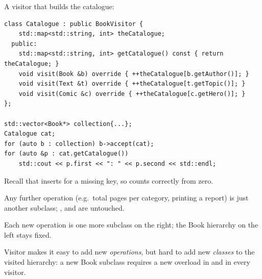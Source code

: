 A visitor that builds the catalogue:
\begin{lstlisting}[style=cpp]
class Catalogue : public BookVisitor {
    std::map<std::string, int> theCatalogue;
  public:
    std::map<std::string, int> getCatalogue() const { return theCatalogue; }
    void visit(Book &b) override { ++theCatalogue[b.getAuthor()]; }
    void visit(Text &t) override { ++theCatalogue[t.getTopic()]; }
    void visit(Comic &c) override { ++theCatalogue[c.getHero()]; }
};

std::vector<Book*> collection{...};
Catalogue cat;
for (auto b : collection) b->accept(cat);
for (auto &p : cat.getCatalogue())
    std::cout << p.first << ": " << p.second << std::endl;
\end{lstlisting}
Recall that  inserts  for a missing key, so
 counts correctly from zero.

Any further operation (e.g.\ total pages per category, printing a report) is
just another  subclass; ,  and
 are untouched.

\begin{center}

\small Each new operation is one more subclass on the right; the Book hierarchy on the left stays fixed.
\end{center}

\begin{important}
Visitor makes it easy to add new \emph{operations}, but hard to add new
\emph{classes} to the visited hierarchy: a new Book subclass requires a new
 overload in  and in every visitor.
\end{important}

